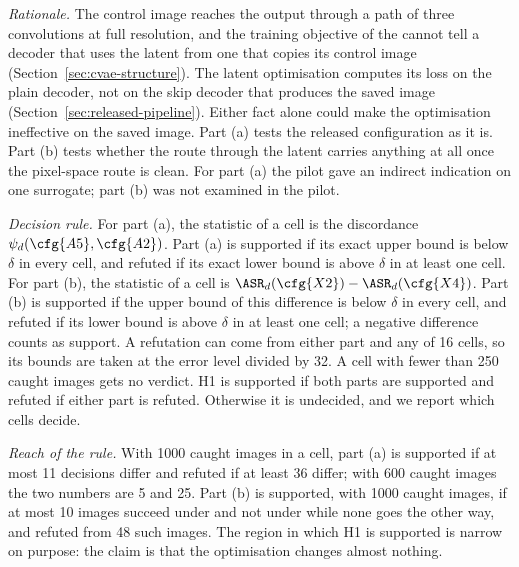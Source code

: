 \emph{Rationale.} The control image reaches the output through a path of three convolutions at
full resolution, and the training objective of the \CVAE cannot tell a decoder that uses the latent
from one that copies its control image (Section~\ref{sec:cvae-structure}). The latent optimisation
computes its loss on the plain decoder, not on the skip decoder that produces the saved image
(Section~\ref{sec:released-pipeline}). Either fact alone could make the optimisation ineffective on
the saved image. Part (a) tests the released configuration as it is. Part (b) tests whether the
route through the latent carries anything at all once the pixel-space route is clean. For part (a)
the pilot gave an indirect indication on one surrogate; part (b) was not examined in the pilot.

\emph{Decision rule.} For part (a), the statistic of a cell is the discordance
$\psi_d(\cfg{A5},\cfg{A2})$. Part (a) is supported if its exact upper bound is below $\delta$ in
every cell, and refuted if its exact lower bound is above $\delta$ in at least one cell. For part
(b), the statistic of a cell is $\ASR_d(\cfg{X2})-\ASR_d(\cfg{X4})$. Part (b) is supported if the
upper bound of this difference is below $\delta$ in every cell, and refuted if its lower bound is
above $\delta$ in at least one cell; a negative difference counts as support. A refutation can
come from either part and any of 16 cells, so its bounds are taken at the error level divided by
32. A cell with fewer than 250 caught images gets no verdict. H1 is supported if both parts are
supported and refuted if either part is refuted. Otherwise it is undecided, and we report which
cells decide.

\emph{Reach of the rule.} With 1000 caught images in a cell, part (a) is supported if at most 11
decisions differ and refuted if at least 36 differ; with 600 caught images the two numbers are 5
and 25. Part (b) is supported, with 1000 caught images, if at most 10 images succeed under 
and not under  while none goes the other way, and refuted from 48 such images. The region
in which H1 is supported is narrow on purpose: the claim is that the optimisation changes almost
nothing.

